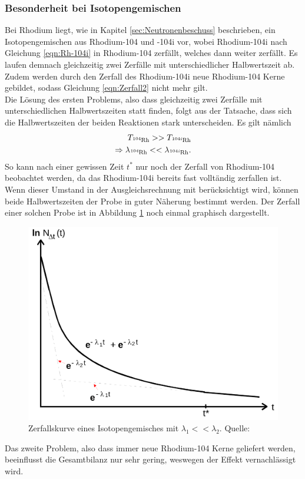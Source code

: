 \subsubsection*{Besonderheit bei Isotopengemischen}
Bei Rhodium liegt, wie in Kapitel \ref{sec:Neutronenbeschuss} beschrieben, ein Isotopengemischen aus 
Rhodium-104 und -104i vor, wobei Rhodium-104i nach Gleichung \ref{eqn:Rh-104i} in Rhodium-104 zerfällt,
welches dann weiter zerfällt. Es laufen demnach gleichzeitig zwei Zerfälle mit unterschiedlicher 
Halbwertszeit ab. Zudem werden durch den Zerfall des Rhodium-104i neue Rhodium-104 Kerne gebildet, sodass
Gleichung \ref{eqn:Zerfall2} nicht mehr gilt.\\
Die Lösung des ersten Problems, also dass gleichzeitig zwei Zerfälle mit unterschiedlichen 
Halbwertszeiten statt finden, folgt aus der Tatsache, dass sich die Halbwertszeiten der beiden Reaktionen
stark unterscheiden. Es gilt nämlich
\begin{align*}
    T_{\ce{^{104}Rh}}>>T_{\ce{^{104i}Rh}}\\
    \Rightarrow
    \lambda_{\ce{^{104}Rh}}<<\lambda_{\ce{^{104i}Rh}}.
\end{align*}
So kann nach einer gewissen Zeit $t^*$ nur noch der Zerfall von Rhodium-104 beobachtet werden, da das 
Rhodium-104i bereits fast volltändig zerfallen ist. Wenn dieser Umstand in der Ausgleichsrechnung 
mit berücksichtigt wird, können beide Halbwertszeiten der Probe in guter Näherung bestimmt werden.
Der Zerfall einer solchen Probe ist in Abbildung \ref{fig:Isotopengemisch} noch einmal graphisch 
dargestellt. 
\begin{figure}[H]
    \centering
    \includegraphics[scale=0.4]{content/Isotopengemisch.png}
    \caption{Zerfallskurve eines Isotopengemisches mit $\lambda_1<<\lambda_2$. Quelle:\cite{AP01}}
    \label{fig:Isotopengemisch}
  \end{figure}
\noindent Das zweite Problem, also dass immer neue Rhodium-104 Kerne geliefert werden, beeinflusst die 
Gesamtbilanz nur sehr gering, weswegen der Effekt vernachlässigt wird. 